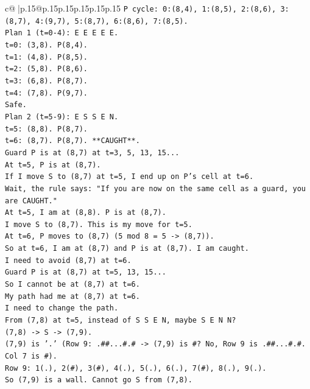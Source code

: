 \documentclass{article}
\begin{document}
{\begin{supertabular}{c@{$\;$}|p{.15\linewidth}@{}p{.15\linewidth}p{.15\linewidth}p{.15\linewidth}p{.15\linewidth}p{.15\linewidth}}
{{{\texttt{P cycle: 0:(8,4), 1:(8,5), 2:(8,6), 3:(8,7), 4:(9,7), 5:(8,7), 6:(8,6), 7:(8,5).} \\
\texttt{Plan 1 (t=0{-}4): E E E E E.} \\
\texttt{t=0: (3,8). P(8,4).} \\
\texttt{t=1: (4,8). P(8,5).} \\
\texttt{t=2: (5,8). P(8,6).} \\
\texttt{t=3: (6,8). P(8,7).} \\
\texttt{t=4: (7,8). P(9,7).} \\
\texttt{Safe.} \\
\texttt{Plan 2 (t=5{-}9): E S S E N.} \\
\texttt{t=5: (8,8). P(8,7).} \\
\texttt{t=6: (8,7). P(8,7). **CAUGHT**.} \\
\texttt{Guard P is at (8,7) at t=3, 5, 13, 15...} \\
\texttt{At t=5, P is at (8,7).} \\
\texttt{If I move S to (8,7) at t=5, I end up on P's cell at t=6.} \\
\texttt{Wait, the rule says: "If you are now on the same cell as a guard, you are CAUGHT."} \\
\texttt{At t=5, I am at (8,8). P is at (8,7).} \\
\texttt{I move S to (8,7). This is my move for t=5.} \\
\texttt{At t=6, P moves to (8,7) (5 mod 8 = 5 {-}> (8,7)).} \\
\texttt{So at t=6, I am at (8,7) and P is at (8,7). I am caught.} \\
\texttt{I need to avoid (8,7) at t=6.} \\
\texttt{Guard P is at (8,7) at t=5, 13, 15...} \\
\texttt{So I cannot be at (8,7) at t=6.} \\
\texttt{My path had me at (8,7) at t=6.} \\
\texttt{I need to change the path.} \\
\texttt{From (7,8) at t=5, instead of S S E N, maybe S E N N?} \\
\texttt{(7,8) {-}> S {-}> (7,9).} \\
\texttt{(7,9) is '.' (Row 9: .\#\#...\#.\# {-}> (7,9) is \#? No, Row 9 is .\#\#...\#.\#. Col 7 is \#).} \\
\texttt{Row 9: 1(.), 2(\#), 3(\#), 4(.), 5(.), 6(.), 7(\#), 8(.), 9(.).} \\
\texttt{So (7,9) is a wall. Cannot go S from (7,8).} \\
}}}
\end{supertabular}}
\end{document}

